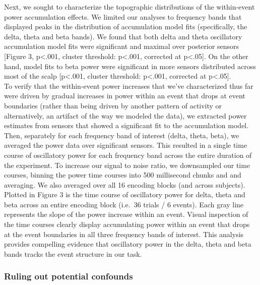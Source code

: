 Next, we sought to characterize the topographic distributions of the
within-event power accumulation effects. We limited our analyses to
frequency bands that displayed peaks in the distribution of accumulation
model fits (specifically, the delta, theta and beta bands). We found
that both delta and theta oscillatory accumulation model fits were
significant and maximal over posterior sensors {[}Figure 3,
p\textless{}.001, cluster threshold: p\textless{}.001, corrected at
p\textless{}.05{]}. On the other hand, model fits to beta power were
significant in more sensors distributed across most of the scalp
{[}p\textless{}.001, cluster threshold: p\textless{}.001, corrected at
p\textless{}.05{]}.\\
To verify that the within-event power increases that we've characterized
thus far were driven by gradual increases in power within an event that
drops at event boundaries (rather than being driven by another pattern
of activity or alternatively, an artifact of the way we modeled the
data), we extracted power estimates from sensors that showed a
significant fit to the accumulation model. Then, separately for each
frequency band of interest (delta, theta, beta), we averaged the power
data over significant sensors. This resulted in a single time course of
oscillatory power for each frequency band across the entire duration of
the experiment. To increase our signal to noise ratio, we downsampled
our time courses, binning the power time courses into 500 millisecond
chunks and and averaging. We also averaged over all 16 encoding blocks
(and across subjects). Plotted in Figure 3 is the time course of
oscillatory power for delta, theta and beta across an entire encoding
block (i.e.~36 trials / 6 events). Each gray line represents the slope
of the power increase within an event. Visual inspection of the time
courses clearly display accumulating power within an event that drops at
the event boundaries in all three frequency bands of interest. This
analysis provides compelling evidence that oscillatory power in the
delta, theta and beta bands tracks the event structure in our task.

\subsubsection{Ruling out potential
confounds}\label{ruling-out-potential-confounds}

